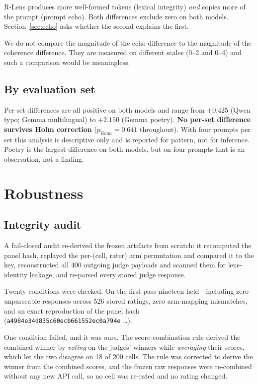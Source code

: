 \documentclass[11pt]{article}
\begin{document}
R-Lens produces more well-formed tokens (lexical integrity) \emph{and} copies
more of the prompt (prompt echo). Both differences exclude zero on both models.
Section~\ref{sec:echo} asks whether the second explains the first.

We do not compare the magnitude of the echo difference to the magnitude of the
coherence difference. They are measured on different scales (0--2 and 0--4) and
such a comparison would be meaningless.

\subsection{By evaluation set}

Per-set differences are all positive on both models and range from $+0.425$
(Qwen typo; Gemma multilingual) to $+2.150$ (Gemma poetry). \textbf{No per-set
difference survives Holm correction} ($p_{\text{Holm}} = 0.641$ throughout).
With four prompts per set this analysis is descriptive only and is reported for
pattern, not for inference. Poetry is the largest difference on both models,
but on four prompts that is an observation, not a finding.

\section{Robustness}

\subsection{Integrity audit}

A fail-closed audit re-derived the frozen artifacts from scratch: it recomputed
the panel hash, replayed the per-(cell, rater) arm permutation and compared it
to the key, reconstructed all 400 outgoing judge payloads and scanned them for
lens-identity leakage, and re-parsed every stored judge response.

Twenty conditions were checked. On the first pass nineteen held---including
zero unparseable responses across 526 stored ratings, zero arm-mapping
mismatches, and an exact reproduction of the panel hash
(\texttt{a4984e34\allowbreak{}d835c60e\allowbreak{}cb661552\allowbreak{}ec0a794e}
\dots).

One condition failed, and it was ours. The score-combination rule derived the
combined winner by \emph{voting} on the judges' winners while \emph{averaging}
their scores, which let the two disagree on 18 of 200 cells. The rule was
corrected to derive the winner from the combined scores, and the frozen raw
responses were re-combined without any new API call, so no cell was re-rated and
no rating changed.
\end{document}
